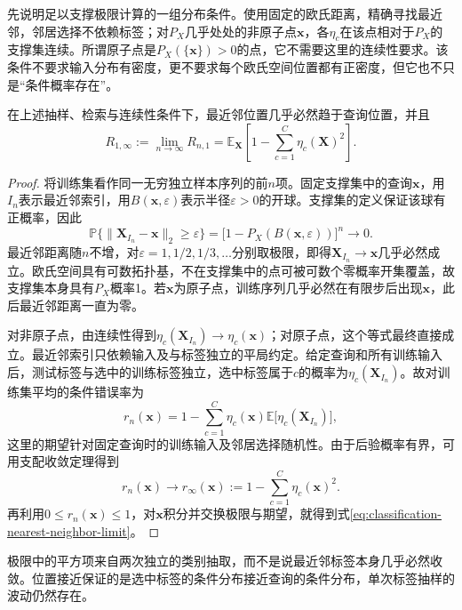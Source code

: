 先说明足以支撑极限计算的一组分布条件。使用固定的欧氏距离，精确寻找最近邻，邻居选择不依赖标签；对$P_X$几乎处处的非原子点$\bm{x}$，各$\eta_c$在该点相对于$P_X$的支撑集连续。所谓原子点是$P_X(\{\bm{x}\})>0$的点，它不需要这里的连续性要求。该条件不要求输入分布有密度，更不要求每个欧氏空间位置都有正密度，但它也不只是“条件概率存在”。

\begin{lemma}[最近邻风险的极限]
  \label{lem:classification-nearest-neighbor-limit}
  在上述抽样、检索与连续性条件下，最近邻位置几乎必然趋于查询位置，并且
  \begin{equation}
    R_{1,\infty}:=\lim_{n\to\infty}R_{n,1}
    =\mathbb{E}_{\bm{X}}\left[
      1-\sum_{c=1}^{C}\eta_c(\bm{X})^2
    \right].
    \label{eq:classification-nearest-neighbor-limit}
  \end{equation}
\end{lemma}

\begin{proof}
  将训练集看作同一无穷独立样本序列的前$n$项。固定支撑集中的查询$\bm{x}$，用$I_n$表示最近邻索引，用$B(\bm{x},\varepsilon)$表示半径$\varepsilon>0$的开球。支撑集的定义保证该球有正概率，因此
  \[
    \mathbb{P}\{\|\bm{X}_{I_n}-\bm{x}\|_2\geq\varepsilon\}
    =\bigl[1-P_X(B(\bm{x},\varepsilon))\bigr]^n
    \longrightarrow0.
  \]
  最近邻距离随$n$不增，对$\varepsilon=1,1/2,1/3,\ldots$分别取极限，即得$\bm{X}_{I_n}\to\bm{x}$几乎必然成立。欧氏空间具有可数拓扑基，不在支撑集中的点可被可数个零概率开集覆盖，故支撑集本身具有$P_X$概率1。若$\bm{x}$为原子点，训练序列几乎必然在有限步后出现$\bm{x}$，此后最近邻距离一直为零。

  对非原子点，由连续性得到$\eta_c(\bm{X}_{I_n})\to\eta_c(\bm{x})$；对原子点，这个等式最终直接成立。最近邻索引只依赖输入及与标签独立的平局约定。给定查询和所有训练输入后，测试标签与选中的训练标签独立，选中标签属于$c$的概率为$\eta_c(\bm{X}_{I_n})$。故对训练集平均的条件错误率为
  \[
    r_n(\bm{x})
    =1-\sum_{c=1}^{C}\eta_c(\bm{x})
       \mathbb{E}\bigl[\eta_c(\bm{X}_{I_n})\bigr],
  \]
  这里的期望针对固定查询时的训练输入及邻居选择随机性。由于后验概率有界，可用支配收敛定理得到
  \[
    r_n(\bm{x})\longrightarrow
    r_\infty(\bm{x})
    :=1-\sum_{c=1}^{C}\eta_c(\bm{x})^2.
  \]
  再利用$0\leq r_n(\bm{x})\leq1$，对$\bm{x}$积分并交换极限与期望，就得到式\eqref{eq:classification-nearest-neighbor-limit}。
\end{proof}

极限中的平方项来自两次独立的类别抽取，而不是说最近邻标签本身几乎必然收敛。位置接近保证的是选中标签的条件分布接近查询的条件分布，单次标签抽样的波动仍然存在。

